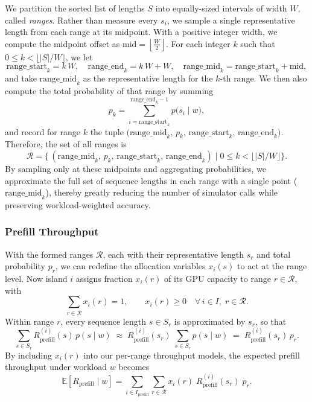 We partition the sorted list of lengths \(S\) into equally-sized intervals of width \(W\), called \textit{ranges}.
Rather than measure every \(s_i\), we sample a single representative length from each range at its midpoint.
With a positive integer width, we compute the midpoint offset as \(\mathrm{mid} = \left\lfloor \tfrac{W}{2}\right\rfloor\).
For each integer \(k\) such that \(0 \le k < \lfloor \lvert S\rvert / W\rfloor\), we let 
\[
\mathrm{range\_start}_k = k\,W,\quad
\mathrm{range\_end}_k = k\,W + W,\quad
\mathrm{range\_mid}_k = \mathrm{range\_start}_k + \mathrm{mid},
\]
and take \(\mathrm{range\_mid}_k\) as the representative length for the \(k\)-th range. We then also compute the total probability of that range by summing 
\[
p_k = \sum_{i = \mathrm{range\_start}_k}^{\mathrm{range\_end}_k - 1} p\bigl(s_i \mid w\bigr),
\]
and record for range \(k\) the tuple \(\bigl(\mathrm{range\_mid}_k,\,p_k,\,\mathrm{range\_start}_k,\,\mathrm{range\_end}_k\bigr)\). Therefore, the set of all ranges is 
\[
\mathcal{R} = \bigl\{\,(\mathrm{range\_mid}_k,\,p_k,\,\mathrm{range\_start}_k,\,\mathrm{range\_end}_k)\mid 0 \le k < \lfloor \lvert S\rvert / W\rfloor \bigr\}.
\]
By sampling only at these midpoints and aggregating probabilities, we approximate the full set of sequence lengths in each range with a single point (\(\mathrm{range\_mid}_k\)), thereby greatly reducing the number of simulator calls while preserving workload-weighted accuracy.


\subsubsection*{Prefill Throughput}

With the formed ranges \(\mathcal{R}\), each with their representative length \(s_r\) and total probability \(p_r\), we can redefine the allocation variables \(x_i(s)\) to act at the range level. 
Now island \(i\) assigns fraction \(x_i(r)\) of its GPU capacity to range \(r\in\mathcal{R}\), with
\[
\sum_{r\in\mathcal{R}} x_i(r) = 1,
\qquad
x_i(r)\ge0\quad\forall\,i\in I,\;r\in\mathcal{R}.
\]
Within range \(r\), every sequence length \(s\in S_r\) is approximated by \(s_r\), so that
\[
\sum_{s\in S_r} R_{\mathrm{prefill}}^{(i)}(s)\,p(s\mid w)\;\approx\;
R_{\mathrm{prefill}}^{(i)}(s_r)\;\sum_{s\in S_r}p(s\mid w)
\;=\;
R_{\mathrm{prefill}}^{(i)}(s_r)\,p_r.
\]
By including \(x_i(r)\) into our per-range throughput models, the expected prefill throughput under workload \(w\) becomes
\[
\mathbb{E}[R_{\mathrm{prefill}}\mid w]
=\sum_{i\in I_{\mathrm{prefill}}}\sum_{r\in\mathcal{R}}
x_i(r)\;R_{\mathrm{prefill}}^{(i)}(s_r)\;p_r.
\]

